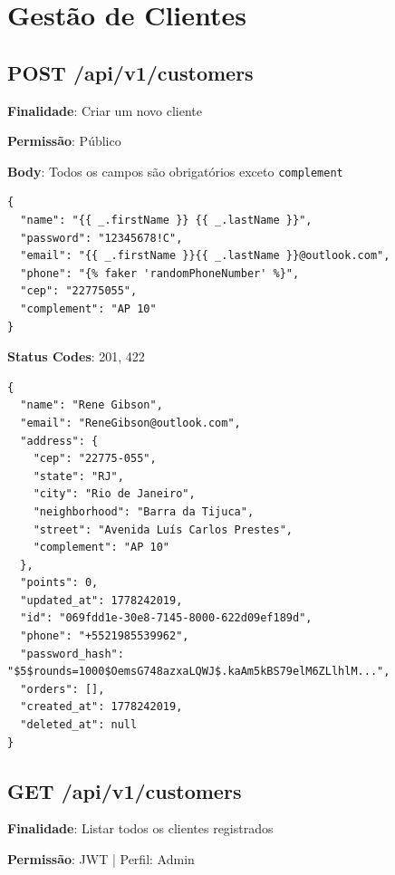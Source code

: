 \section{Gestão de Clientes}

\subsection{POST /api/v1/customers}

\noindent\textbf{Finalidade}: Criar um novo cliente

\noindent\textbf{Permissão}: Público

\noindent\textbf{Body}: Todos os campos são obrigatórios exceto \texttt{complement}

\vspace{-0.2cm}

\begin{verbatim}
{
  "name": "{{ _.firstName }} {{ _.lastName }}",
  "password": "12345678!C",
  "email": "{{ _.firstName }}{{ _.lastName }}@outlook.com",
  "phone": "{% faker 'randomPhoneNumber' %}",
  "cep": "22775055",
  "complement": "AP 10"
}
\end{verbatim}

\noindent\textbf{Status Codes}: 201, 422

\begin{tcolorbox}[colback=green!5, colframe=black, title=\textbf{201 Created}]
\begin{verbatim}
{
  "name": "Rene Gibson",
  "email": "ReneGibson@outlook.com",
  "address": {
    "cep": "22775-055",
    "state": "RJ",
    "city": "Rio de Janeiro",
    "neighborhood": "Barra da Tijuca",
    "street": "Avenida Luís Carlos Prestes",
    "complement": "AP 10"
  },
  "points": 0,
  "updated_at": 1778242019,
  "id": "069fdd1e-30e8-7145-8000-622d09ef189d",
  "phone": "+5521985539962",
  "password_hash": "$5$rounds=1000$OemsG748azxaLQWJ$.kaAm5kBS79elM6ZLlhlM...",
  "orders": [],
  "created_at": 1778242019,
  "deleted_at": null
}
\end{verbatim}
\end{tcolorbox}

\subsection{GET /api/v1/customers}

\noindent\textbf{Finalidade}: Listar todos os clientes registrados

\noindent\textbf{Permissão}: JWT | Perfil: Admin


